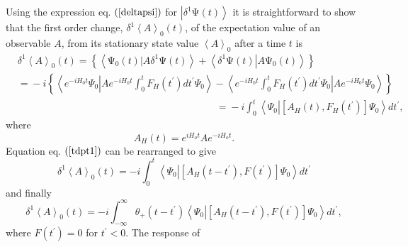 \documentclass[aps,preprint]{revtex4}%
\begin{document}
Using the expression eq. $\left(  \ref{deltapsi}\right)  $ for $\left\vert
\delta^{1}\mathrm{\Psi}\left(  t\right)  \right\rangle $ it is straightforward
to show that the first order change, $\delta^{1}\left\langle A\right\rangle
_{0}\left(  t\right)  $, of the expectation value of an observable $A$, from
its stationary state value $\left\langle A\right\rangle _{0}$ after a time $t$
is
\begin{align}
&  \delta^{1}\left\langle A\right\rangle _{0}\left(  t\right)  =\left\{
\left\langle \left.  \mathrm{\Psi}_{0}\left(  t\right)  \right\vert
A\delta^{1}\mathrm{\Psi}\left(  t\right)  \right\rangle +\left\langle \left.
\delta^{1}\mathrm{\Psi}\left(  t\right)  \right\vert A\mathrm{\Psi}_{0}\left(
t\right)  \right\rangle \right\} \nonumber\\
&  \left.  =\right.  -i\left\{  \left\langle e^{-iH_{0}t}\Psi_{0}\left\vert
Ae^{-iH_{0}t}\int_{0}^{t}F_{H}\left(  t^{\prime}\right)  dt^{\prime}\Psi
_{0}\right.  \right\rangle -\left\langle \left.  e^{-iH_{0}t}\int_{0}^{t}%
F_{H}\left(  t^{\prime}\right)  dt^{\prime}\Psi_{0}\right\vert Ae^{-iH_{0}%
t}\Psi_{0}\right\rangle \right\} \nonumber\\
&  \qquad\qquad\qquad\qquad\qquad\qquad\qquad\qquad\qquad\qquad\left.
=\right.  -i\int_{0}^{t}\left\langle \Psi_{0}\left\vert \left[  A_{H}\left(
t\right)  ,F_{H}\left(  t^{\prime}\right)  \right]  \right.  \Psi
_{0}\right\rangle dt^{\prime}, \label{tdpt1}%
\end{align}
where
\begin{equation}
A_{H}\left(  t\right)  =e^{iH_{o}t}Ae^{-iH_{o}t}.
\end{equation}
Equation eq. $\left(  \ref{tdpt1}\right)  $ can be rearranged to give
\begin{equation}
\delta^{1}\left\langle A\right\rangle _{0}\left(  t\right)  =-i\int_{0}%
^{t}\left\langle \Psi_{0}\left\vert \left[  A_{H}\left(  t-t^{\prime}\right)
,F\left(  t^{\prime}\right)  \right]  \right.  \Psi_{0}\right\rangle
dt^{\prime} \label{resquant}%
\end{equation}
and finally
\begin{equation}
\delta^{1}\left\langle A\right\rangle _{0}\left(  t\right)  =-i\int_{-\infty
}^{\infty}\theta_{+}\left(  t-t^{\prime}\right)  \left\langle \Psi
_{0}\left\vert \left[  A_{H}\left(  t-t^{\prime}\right)  ,F\left(  t^{\prime
}\right)  \right]  \right.  \Psi_{0}\right\rangle dt^{\prime},
\end{equation}
where $F\left(  t^{\prime}\right)  =0$ for $t^{\prime}<0.$ The response of
\end{document}
